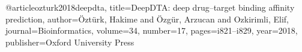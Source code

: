 @article{ozturk2018deepdta,
  title={DeepDTA: deep drug--target binding affinity prediction},
  author={{\"O}zt{\"u}rk, Hakime and {\"O}zg{\"u}r, Arzucan and Ozkirimli, Elif},
  journal={Bioinformatics},
  volume={34},
  number={17},
  pages={i821--i829},
  year={2018},
  publisher={Oxford University Press}
}